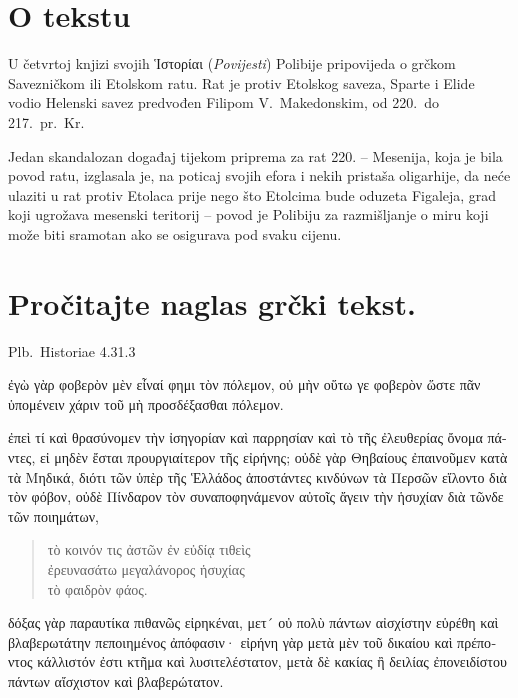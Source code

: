 

\section*{O tekstu}

U četvrtoj knjizi svojih \textgreek[variant=ancient]{Ἱστορίαι} (\textit{Povijesti}) Polibije pripovijeda o grčkom Savezničkom ili Etolskom ratu. Rat je protiv Etolskog saveza, Sparte i Elide vodio Helenski savez predvođen Filipom V.\ Makedonskim, od 220.\ do 217.\ pr.~Kr.

Jedan skandalozan događaj tijekom priprema za rat 220. – Mesenija, koja je bila povod ratu, izglasala je, na poticaj svojih efora i nekih pristaša oligarhije, da neće ulaziti u rat protiv Etolaca prije nego što Etolcima bude oduzeta Figaleja, grad koji ugrožava mesenski teritorij – povod je Polibiju za razmišljanje o miru koji može biti sramotan ako se osigurava pod svaku cijenu.





\section*{Pročitajte naglas grčki tekst.}

Plb.\ Historiae 4.31.3

\medskip


{\large

\begin{greek}

\noindent ἐγὼ γὰρ φοβερὸν μὲν εἶναί φημι τὸν πόλεμον, οὐ μὴν οὕτω γε φοβερὸν ὥστε πᾶν ὑπομένειν χάριν τοῦ μὴ προσδέξασθαι πόλεμον.

\noindent ἐπεὶ τί καὶ θρασύνομεν τὴν ἰσηγορίαν καὶ παρρησίαν καὶ τὸ τῆς ἐλευθερίας ὄνομα πάντες, εἰ μηδὲν ἔσται προυργιαίτερον τῆς εἰρήνης; οὐδὲ γὰρ Θηβαίους ἐπαινοῦμεν κατὰ τὰ Μηδικά, διότι τῶν ὑπὲρ τῆς Ἑλλάδος ἀποστάντες κινδύνων τὰ Περσῶν εἵλοντο διὰ τὸν φόβον, οὐδὲ Πίνδαρον τὸν συναποφηνάμενον αὐτοῖς ἄγειν τὴν ἡσυχίαν διὰ τῶνδε τῶν ποιημάτων,
\begin{verse}
τὸ κοινόν τις ἀστῶν ἐν εὐδίᾳ τιθεὶς\\
ἐρευνασάτω μεγαλάνορος ἡσυχίας\\
τὸ φαιδρὸν φάος.\\

\end{verse}
δόξας γὰρ παραυτίκα πιθανῶς εἰρηκέναι, μετ´ οὐ πολὺ πάντων αἰσχίστην εὑρέθη καὶ βλαβερωτάτην πεποιημένος ἀπόφασιν· εἰρήνη γὰρ μετὰ μὲν τοῦ δικαίου καὶ πρέποντος κάλλιστόν ἐστι κτῆμα καὶ λυσιτελέστατον, μετὰ δὲ κακίας ἢ δειλίας ἐπονειδίστου πάντων αἴσχιστον καὶ βλαβερώτατον.

\end{greek}

}

